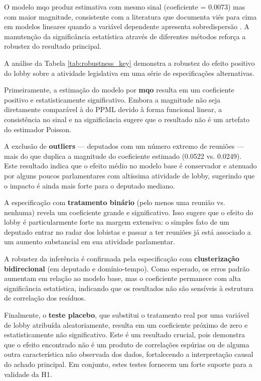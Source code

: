 O modelo \acrshort{mqo} produz estimativa com mesmo sinal (coeficiente = 0.0073) mas com maior magnitude, consistente com a literatura que documenta viés para cima em modelos lineares quando a variável dependente apresenta sobredispersão \cite{silva2006log}. A manutenção da significância estatística através de diferentes métodos reforça a robustez do resultado principal.



A análise da Tabela \ref{tab:robustness_key} demonstra a robustez do efeito positivo do lobby sobre a atividade legislativa em uma série de especificações alternativas.

Primeiramente, a estimação do modelo por \textbf{\acrshort{mqo}} resulta em um coeficiente positivo e estatisticamente significativo. Embora a magnitude não seja diretamente comparável à do PPML devido à forma funcional linear, a consistência no sinal e na significância sugere que o resultado não é um artefato do estimador Poisson.

A exclusão de \textbf{outliers} — deputados com um número extremo de reuniões — mais do que duplica a magnitude do coeficiente estimado (0.0522 vs. 0.0249). Este resultado indica que o efeito médio no modelo base é conservador e atenuado por alguns poucos parlamentares com altíssima atividade de lobby, sugerindo que o impacto é ainda mais forte para o deputado mediano.

A especificação com \textbf{tratamento binário} (pelo menos uma reunião vs. nenhuma) revela um coeficiente grande e significativo. Isso sugere que o efeito do lobby é particularmente forte na margem extensiva: o simples fato de um deputado entrar no radar dos lobistas e passar a ter reuniões já está associado a um aumento substancial em sua atividade parlamentar.

A robustez da inferência é confirmada pela especificação com \textbf{clusterização bidirecional} (em deputado e domínio-tempo). Como esperado, os erros padrão aumentam em relação ao modelo base, mas o coeficiente permanece com alta significância estatística, indicando que os resultados não são sensíveis à estrutura de correlação dos resíduos.

Finalmente, o \textbf{teste placebo}, que substitui o tratamento real por uma variável de lobby atribuída aleatoriamente, resulta em um coeficiente próximo de zero e estatisticamente não significativo. Este é um resultado crucial, pois demonstra que o efeito encontrado não é um produto de correlações espúrias ou de alguma outra característica não observada dos dados, fortalecendo a interpretação causal do achado principal. Em conjunto, estes testes fornecem um forte suporte para a validade da H1.


